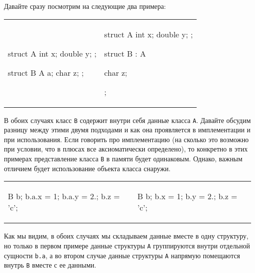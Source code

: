 Давайте сразу посмотрим на следующие два примера:
\begin{center}
\begin{tabular}{ll}
{
\begin{minipage}[\baselineskip]{7cm}
\begin{cppcode}[numbers = none]
struct A {
  int x;
  double y;
};

struct B {
  A a;
  char z;
};
\end{cppcode}
\end{minipage}
}&{
\begin{minipage}[\baselineskip]{7cm}
\begin{cppcode}[numbers = none]
struct A {
  int x;
  double y;
};

struct B : A {

  char z;
};
\end{cppcode}
\end{minipage}
}\\
\end{tabular}
\end{center}
В обоих случаях класс \verb"B" содержит внутри себя данные класса \verb"A".
Давайте обсудим разницу между этими двумя подходами и как она проявляется в имплементации и при использования.
Если говорить про имплементацию (на сколько это возможно при условии, что в плюсах все аксиоматически определено), то конкретно в этих примерах представление класса \verb"B" в памяти будет одинаковым.
Однако, важным отличием будет использование объекта класса снаружи.
\begin{center}
\begin{tabular}{ll}
{
\begin{minipage}[\baselineskip]{7cm}
\begin{cppcode}[numbers = none]
B b;
b.a.x = 1;
b.a.y = 2.;
b.z = 'c';
\end{cppcode}
\end{minipage}
}&{
\begin{minipage}[\baselineskip]{7cm}
\begin{cppcode}[numbers = none]
B b;
b.x = 1;
b.y = 2.;
b.z = 'c';
\end{cppcode}
\end{minipage}
}\\
\end{tabular}
\end{center}
Как мы видим, в обоих случаях мы складываем данные вместе в одну структуру, но только в первом примере данные структуры \verb"A" группируются внутри отдельной сущности \verb"b.a", а во втором случае данные структуры \verb"A" напрямую помещаются внутрь \verb"B" вместе с ее данными.
